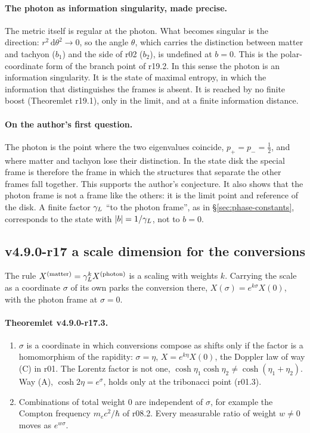 \paragraph{The photon as information singularity, made precise.}
The metric itself is regular at the photon.  What becomes singular is the direction: \(r^2\,\mathrm d\theta^2\to0\), so the angle
\(\theta\), which carries the distinction between matter and tachyon (\(b_1\)) and the side of r02 (\(b_2\)), is undefined at
\(b=0\).  This is the polar-coordinate form of the branch point of r19.2.  In this sense the photon is an information
singularity.  It is the state of maximal entropy, in which the information that distinguishes the frames is absent.  It is
reached by no finite boost (Theoremlet r19.1), only in the limit, and at a finite information distance.

\paragraph{On the author's first question.}
The photon is the point where the two eigenvalues coincide, \(p_+=p_-=\tfrac12\), and where matter and tachyon lose their
distinction.  In the state disk the special frame is therefore the frame in which the structures that separate the other
frames fall together.  This supports the author's conjecture.  It also shows that the photon frame is not a frame like the
others: it is the limit point and reference of the disk.  A finite factor \(\gamma_L\) ``to the photon frame'', as in
\S\ref{sec:phase-constants}, corresponds to the state with \(|b|=1/\gamma_L\), not to \(b=0\).

\subsection*{v4.9.0-r17 a scale dimension for the conversions}
\label{subsec:v490-r17-scale}

The rule \(X^{(\mathrm{matter})}=\gamma_L^{k}X^{(\mathrm{photon})}\) is a scaling with weights \(k\).  Carrying the scale as a coordinate
\(\sigma\) of its own parks the conversion there, \(X(\sigma)=e^{k\sigma}X(0)\), with the photon frame at \(\sigma=0\).

\paragraph{Theoremlet v4.9.0-r17.3.}
\begin{enumerate}[leftmargin=2em]
\item[(a)] \(\sigma\) is a coordinate in which conversions compose as shifts only if the factor is a homomorphism of the
rapidity: \(\sigma=\eta\), \(X=e^{k\eta}X(0)\), the Doppler law of way (C) in r01.  The Lorentz factor is not one,
\(\cosh\eta_1\cosh\eta_2\neq\cosh(\eta_1+\eta_2)\).  Way (A), \(\cosh2\eta=e^{\sigma}\), holds only at the tribonacci point (r01.3).
\item[(b)] Combinations of total weight \(0\) are independent of \(\sigma\), for example the Compton frequency
\(m_ec^2/\hbar\) of r08.2.  Every measurable ratio of weight \(w\neq0\) moves as \(e^{w\sigma}\).
\end{enumerate}

